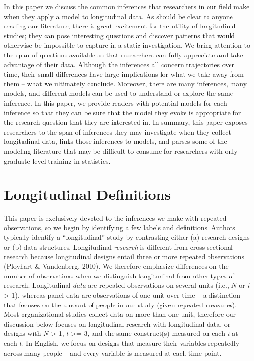 \documentclass[english,,man]{apa6}
\theoremstyle{definition}
\theoremstyle{definition}
\theoremstyle{definition}
\theoremstyle{remark}
\begin{document}
In this paper we discuss the common inferences that researchers in our
field make when they apply a model to longitudinal data. As should be
clear to anyone reading our literature, there is great excitement for
the utility of longitudinal studies; they can pose interesting questions
and discover patterns that would otherwise be impossible to capture in a
static investigation. We bring attention to the span of questions
available so that researchers can fully appreciate and take advantage of
their data. Although the inferences all concern trajectories over time,
their small differences have large implications for what we take away
from them -- what we ultimately conclude. Moreover, there are many
inferences, many models, and different models can be used to understand
or explore the same inference. In this paper, we provide readers with
potential models for each inference so that they can be sure that the
model they evoke is appropriate for the research question that they are
interested in. In summary, this paper exposes researchers to the span of
inferences they may investigate when they collect longitudinal data,
links those inferences to models, and parses some of the modeling
literature that may be difficult to consume for researchers with only
graduate level training in statistics.

\hypertarget{longitudinal-definitions}{%
\section{Longitudinal Definitions}\label{longitudinal-definitions}}

This paper is exclusively devoted to the inferences we make with
repeated observations, so we begin by identifying a few labels and
definitions. Authors typically identify a \enquote{longitudinal} study
by contrasting either (a) research designs or (b) data structures.
Longitudinal \emph{research} is different from cross-sectional research
because longitudinal designs entail three or more repeated observations
(Ployhart \& Vandenberg, 2010). We therefore emphasize differences on
the number of observations when we distinguish longitudinal from other
types of research. Longitudinal \emph{data} are repeated observations on
several units (i.e., \(N\) or \(i\) \textgreater{} 1), whereas panel
data are observations of one unit over time -- a distinction that
focuses on the amount of people in our study (given repeated measures).
Most organizational studies collect data on more than one unit,
therefore our discussion below focuses on longitudinal research with
longitudinal data, or designs with \(N\) \textgreater{} 1, \(t\)
\textgreater{}= 3, and the same construct(s) measured on each \(i\) at
each \(t\). In English, we focus on designs that measure their variables
repeatedly across many people -- and every variable is measured at each
time point.
\end{document}
